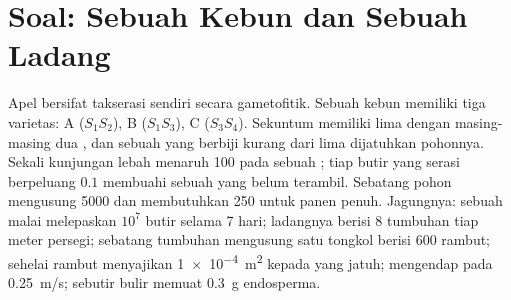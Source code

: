 \section{Soal: Sebuah Kebun dan Sebuah Ladang}

\begin{problem}
\label{pb:b2:angiosperm-reproduction:1}
Apel bersifat takserasi sendiri secara gametofitik. Sebuah kebun
memiliki tiga varietas: A ($S_1S_2$), B ($S_1S_3$), C ($S_3S_4$).
Sekuntum  memiliki lima  dengan masing-masing dua , dan sebuah  yang berbiji kurang dari lima dijatuhkan
pohonnya. Sekali kunjungan lebah menaruh \num{100} 
pada sebuah ; tiap butir yang serasi berpeluang $0.1$
membuahi sebuah  yang belum terambil. Sebatang pohon
mengusung \num{5000}  dan membutuhkan \num{250}  untuk panen
penuh. Jagungnya: sebuah malai melepaskan $10^{7}$ butir selama
\num{7} hari; ladangnya berisi \num{8} tumbuhan tiap meter persegi;
sebatang tumbuhan mengusung satu tongkol berisi \num{600} rambut;
sehelai rambut menyajikan \qty{1e-4}{m^2} kepada  yang
jatuh;  mengendap pada \qty{0.25}{m/s}; sebutir bulir
memuat \qty{0.3}{g} endosperma.


\end{problem}
